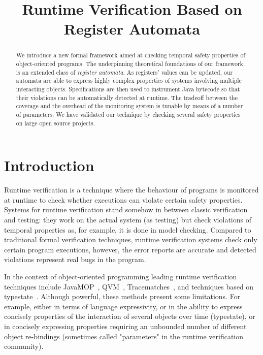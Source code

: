 \documentclass[9pt, preprint]{sigplanconf} %
\title{Runtime Verification Based on Register Automata}
\theoremstyle{definition}
\theoremstyle{remark}
\begin{document}
\maketitle
\begin{abstract} %
We introduce a new formal framework aimed at checking temporal safety properties of object-oriented programs.
The underpinning theoretical foundations of our framework is an extended class of {\em register automata}.
As registers' values can be updated, our automata are able to express highly complex properties of systems involving multiple interacting objects.
Specifications are then used to instrument Java bytecode so that their violations can be automatically detected at runtime.
The tradeoff between the coverage and the overhead of the monitoring
system is tunable by means of a number of  parameters.
We have validated our technique by checking several safety properties on large open source projects.

\end{abstract}

\section{Introduction} %

Runtime verification is a technique where the behaviour of programs is monitored at runtime to check whether executions
can violate certain safety properties.
Systems for runtime verification stand somehow in between classic verification and testing: they work on the actual system (as testing) but check violations of temporal properties as, for example, it is done in model checking. Compared to traditional formal verification techniques, runtime verification systems check only certain program executions, however, the error reports are accurate and detected violations represent real bugs in the program.

In the context of object-oriented programming  leading runtime verification techniques include JavaMOP~\cite{dblp:journals/sttt/meredithjgcr12}, QVM~\cite{arnold:2008}, Tracematches~\cite{dblp:conf/oopsla/allanachklmsst05}, and techniques based on typestate~\cite{strom1986,dblp:conf/oopsla/bierhoffa07,dblp:conf/oopsla/naeeml08,disney2011,ball2002}. Although powerful,  these methods present some limitations. For example, either   in terms of  language expressivity, or in the ability to express concisely properties of the interaction of several objects 
over time (typestate), or in concisely expressing  properties requiring an unbounded number of different object re-bindings (sometimes called "parameters" in the runtime verification community).
\end{document}
